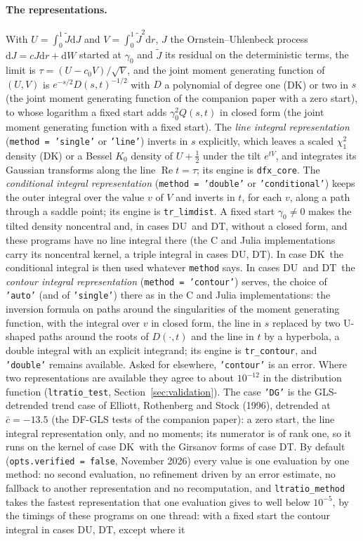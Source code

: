 \documentclass[11pt]{article}
\newcommand{\code}[1]{\texttt{#1}}
\newcommand{\dr}[1]{{\mathrm d}#1}
\newcommand{\Rea}{\operatorname{Re}}
\newcommand{\Fk}{\textsf{DK}}
\newcommand{\Fu}{\textsf{DU}}
\newcommand{\Ft}{\textsf{DT}}
\begin{document}
\paragraph{The representations.}  With $U=\int_0^1\tilde J\dr J$ and $V=\int_0^1\tilde J^2\dr r$, $J$ the Ornstein--Uhlenbeck process $\dr J=cJ\dr r+\dr W$ started at $\gamma_0$ and $\tilde J$ its residual on the deterministic terms, the limit is $\tau=(U-c_0V)/\sqrt V$, and the joint moment generating function of $(U,V)$ is $e^{-s/2}D(s,t)^{-1/2}$ with $D$ a polynomial of degree one (\Fk) or two in $s$ (the joint moment generating function of the companion paper with a zero start), to whose logarithm a fixed start adds $\gamma_0^2Q(s,t)$ in closed form (the joint moment generating function with a fixed start).  The \emph{line integral representation} (\code{method = 'single'} or \code{'line'}) inverts in $s$ explicitly, which leaves a scaled $\chi^2_1$ density (\Fk) or a Bessel $K_0$ density of $U+\frac12$ under the tilt $e^{tV}$, and integrates its Gaussian transforms along the line $\Rea t=\tau$; its engine is \code{dfx\_core}.  The \emph{conditional integral representation} (\code{method = 'double'} or \code{'conditional'}) keeps the outer integral over the value $v$ of $V$ and inverts in $t$, for each $v$, along a path through a saddle point; its engine is \code{tr\_limdist}.  A fixed start $\gamma_0\ne0$ makes the tilted density noncentral and, in cases \Fu\ and \Ft, without a closed form, and these programs have no line integral there (the C and Julia implementations carry its noncentral kernel, a triple integral in cases \Fu, \Ft).  In case \Fk\ the conditional integral is then used whatever \code{method} says.  In cases \Fu\ and \Ft\ the \emph{contour integral representation} (\code{method = 'contour'}) serves, the choice of \code{'auto'} (and of \code{'single'}) there as in the C and Julia implementations: the inversion formula on paths around the singularities of the moment generating function, with the integral over $v$ in closed form, the line in $s$ replaced by two U-shaped paths around the roots of $D(\cdot,t)$ and the line in $t$ by a hyperbola, a double integral with an explicit integrand; its engine is \code{tr\_contour}, and \code{'double'} remains available.  Asked for elsewhere, \code{'contour'} is an error.  Where two representations are available they agree to about $10^{-12}$ in the distribution function (\code{ltratio\_test}, Section~\ref{sec:validation}).  The case \code{'DG'} is the GLS-detrended trend case of Elliott, Rothenberg and Stock (1996), detrended at $\bar c=-13.5$ (the DF-GLS tests of the companion paper): a zero start, the line integral representation only, and no moments; its numerator is of rank one, so it runs on the kernel of case \Fk\ with the Girsanov forms of case \Ft.  By default (\code{opts.verified = false}, November 2026) every value is one evaluation by one method: no second evaluation, no refinement driven by an error estimate, no fallback to another representation and no recomputation, and \code{ltratio\_method} takes the fastest representation that one evaluation gives to well below $10^{-5}$, by the timings of these programs on one thread: with a fixed start the contour integral in cases \Fu, \Ft, except where it 
\end{document}
